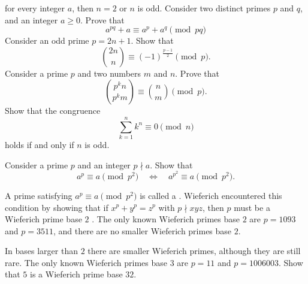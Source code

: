 \begin{routine}
  for every integer $a$, then $n=2$ or $n$ is odd.
  \exercise Consider two distinct primes $p$ and $q$, and an integer $a\geq 0$. Prove that
  \begin{equation*}
    a^{pq}+a\equiv a^p + a^q \pmod{pq}
  \end{equation*}
  \exercise Consider an odd prime $p=2n+1$. Show that
  \begin{equation*}
    \binom{2n}{n}\equiv (-1)^{\frac{p-1}{2}}\pmod{p}.
  \end{equation*}
  \exercise Consider a prime $p$ and two numbers $m$ and $n$. Prove that
  \begin{equation*}
    \binom{p^kn}{p^km}\equiv \binom{n}{m}\pmod{p}.
  \end{equation*}
  \exercise Show that the congruence
  \begin{equation*}
    \sum_{k=1}^{n} k^n\equiv 0\pmod{n}
  \end{equation*}
  holds if and only if $n$ is odd.
  \exercise
  \begin{subexenum}
  \item Consider a prime $p$ and an integer $p\nmid a$. Show that
    \begin{equation*}
      a^p\equiv a\pmod{p^2}\quad\Leftrightarrow \quad a^{p^2}\equiv a\pmod{p^2}.
    \end{equation*}
  \item A prime satisfying $a^p\equiv a\pmod{p^2}$ is called a . Wieferich encountered this condition by showing that if $x^p+y^p=z^p$ with $p\nmid xyz$, then $p$ must be a Wieferich prime base $2$ \cite{wieferich1909}. The only known Wieferich primes base $2$ are $p=1093$ and $p=3511$, and there are no smaller Wieferich primes base $2$.
    
    In bases larger than $2$ there are smaller Wieferich primes, although they are still rare. The only known Wieferich primes base $3$ are $p=11$ and $p=1006003$. Show that $5$ is a Wieferich prime base $32$.
  \end{subexenum}
\end{routine}

